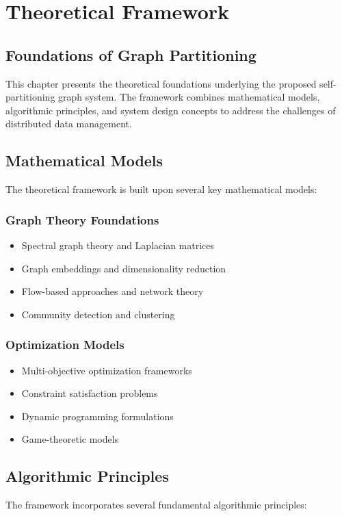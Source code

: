 \chapter{Theoretical Framework}

\section{Foundations of Graph Partitioning}
This chapter presents the theoretical foundations underlying the proposed self-partitioning graph system. The framework combines mathematical models, algorithmic principles, and system design concepts to address the challenges of distributed data management.

\section{Mathematical Models}
The theoretical framework is built upon several key mathematical models:

\subsection{Graph Theory Foundations}
\begin{itemize}
    \item Spectral graph theory and Laplacian matrices
    \item Graph embeddings and dimensionality reduction
    \item Flow-based approaches and network theory
    \item Community detection and clustering
\end{itemize}

\subsection{Optimization Models}
\begin{itemize}
    \item Multi-objective optimization frameworks
    \item Constraint satisfaction problems
    \item Dynamic programming formulations
    \item Game-theoretic models
\end{itemize}

\section{Algorithmic Principles}
The framework incorporates several fundamental algorithmic principles:

